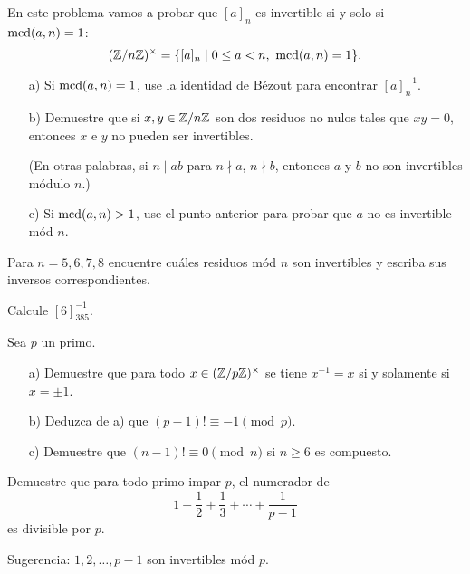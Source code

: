 \documentclass{article}
\begin{document}
\begin{problema}
  \label{probl:invertible-coprimo}
  En este problema vamos a probar que $[a]_n$ es invertible si y solo si
  $\operatorname{mcd} (a,n) = 1$:
  \[ (\mathbb{Z}/n\mathbb{Z})^\times = \{ [a]_n \mid 0 \le a < n, ~ \operatorname{mcd} (a,n) = 1 \}. \]

  \begin{enumerate}
  \item[a)] Si $\operatorname{mcd} (a,n) = 1$, use la identidad de Bézout para encontrar
    $[a]_n^{-1}$.

  \item[b)] Demuestre que si $x,y \in \mathbb{Z}/n\mathbb{Z}$ son dos residuos no nulos tales
    que $xy = 0$, entonces $x$ e $y$ no pueden ser invertibles.

    (En otras palabras, si $n \mid ab$ para $n \nmid a$, $n \nmid b$, entonces
    $a$ y $b$ no son invertibles módulo $n$.)

  \item[c)] Si $\operatorname{mcd} (a,n) > 1$, use el punto anterior para probar que $a$ no es
    invertible mód $n$.
  \end{enumerate}
\end{problema}

\begin{problema}
  Para $n = 5, 6, 7, 8$ encuentre cuáles residuos mód $n$ son invertibles y
  escriba sus inversos correspondientes.
\end{problema}

\begin{problema}
  Calcule $[6]_{385}^{-1}$.
\end{problema}

\begin{problema}
  \label{probl:Wilson-1}
  Sea $p$ un primo.

  \begin{enumerate}
  \item[a)] Demuestre que para todo $x \in (\mathbb{Z}/p\mathbb{Z})^\times$ se tiene
    $x^{-1} = x$ si y solamente si $x = \pm 1$.

  \item[b)] Deduzca de a) que $(p - 1)! \equiv -1 \pmod{p}$.

  \item[c)] Demuestre que $(n-1)! \equiv 0 \pmod{n}$ si $n \ge 6$ es compuesto.
  \end{enumerate}
\end{problema}

\begin{problema}
  Demuestre que para todo primo impar $p$, el numerador de
  $$1 + \frac{1}{2} + \frac{1}{3} + \cdots + \frac{1}{p-1}$$
  es divisible por $p$.

  Sugerencia: $1, 2, \ldots, p-1$ son invertibles mód $p$.
\end{problema}
\end{document}
